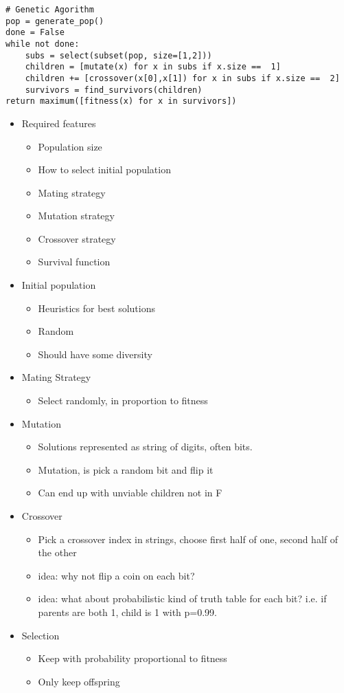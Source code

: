 \documentclass[12pt, letter]{article}
\begin{document}
\begin{verbatim}
# Genetic Agorithm
pop = generate_pop()
done = False
while not done:
    subs = select(subset(pop, size=[1,2]))
    children = [mutate(x) for x in subs if x.size ==  1]
    children += [crossover(x[0],x[1]) for x in subs if x.size ==  2]
    survivors = find_survivors(children)
return maximum([fitness(x) for x in survivors])
\end{verbatim}

\begin{itemize}
    \item Required features
    \begin{itemize}
        \item Population size
        \item How to select initial population
        \item Mating strategy
        \item Mutation strategy
        \item Crossover strategy
        \item Survival function
    \end{itemize}
    \item Initial population
    \begin{itemize}
        \item Heuristics for best solutions
        \item Random
        \item Should have some diversity
    \end{itemize}
    \item Mating Strategy
    \begin{itemize}
        \item Select randomly, in proportion to fitness
    \end{itemize}
    \item Mutation
    \begin{itemize}
        \item Solutions represented as string of digits, often bits.
        \item Mutation, is pick a random bit and flip it
        \item Can end up with unviable children not in F
    \end{itemize}
    \item Crossover
    \begin{itemize}
        \item Pick a crossover index in strings, choose first half of one, second half of the other
        \item idea: why not flip a coin on each bit?
        \item idea: what about probabilistic kind of truth table for each bit? i.e. if parents are both 1, child is 1 with p=0.99.
    \end{itemize}
    \item Selection
    \begin{itemize}
        \item Keep with probability proportional to fitness
        \item Only keep offspring
    \end{itemize}

\end{itemize}
\end{document}
